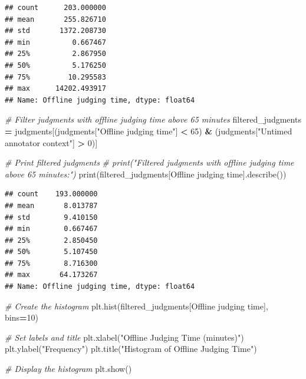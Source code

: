 \documentclass[
]{article}
\newenvironment{Shaded}{\begin{snugshade}}{\end{snugshade}}
\newcommand{\BuiltInTok}[1]{#1}
\newcommand{\CommentTok}[1]{\textcolor[rgb]{0.56,0.35,0.01}{\textit{#1}}}
\newcommand{\DecValTok}[1]{\textcolor[rgb]{0.00,0.00,0.81}{#1}}
\newcommand{\NormalTok}[1]{#1}
\newcommand{\OperatorTok}[1]{\textcolor[rgb]{0.81,0.36,0.00}{\textbf{#1}}}
\newcommand{\StringTok}[1]{\textcolor[rgb]{0.31,0.60,0.02}{#1}}
\begin{document}
\begin{verbatim}
## count      203.000000
## mean       255.826710
## std       1372.208730
## min          0.667467
## 25%          2.867950
## 50%          5.176250
## 75%         10.295583
## max      14202.493917
## Name: Offline judging time, dtype: float64
\end{verbatim}

\begin{Shaded}
\begin{Highlighting}[]
\CommentTok{\# Filter judgments with offline judging time above 65 minutes}
\NormalTok{filtered\_judgments }\OperatorTok{=}\NormalTok{ judgments[(judgments[}\StringTok{"Offline judging time"}\NormalTok{] }\OperatorTok{\textless{}} \DecValTok{65}\NormalTok{) }\OperatorTok{\&}\NormalTok{ (judgments[}\StringTok{"Untimed annotator context"}\NormalTok{] }\OperatorTok{\textgreater{}} \DecValTok{0}\NormalTok{)]}

\CommentTok{\# Print filtered judgments}
\CommentTok{\# print("Filtered judgments with offline judging time above 65 minutes:")}
\BuiltInTok{print}\NormalTok{(filtered\_judgments[}\StringTok{\textquotesingle{}Offline judging time\textquotesingle{}}\NormalTok{].describe())}
\end{Highlighting}
\end{Shaded}

\begin{verbatim}
## count    193.000000
## mean       8.013787
## std        9.410150
## min        0.667467
## 25%        2.850450
## 50%        5.107450
## 75%        8.716300
## max       64.173267
## Name: Offline judging time, dtype: float64
\end{verbatim}

\begin{Shaded}
\begin{Highlighting}[]
\CommentTok{\# Create the histogram}
\NormalTok{plt.hist(filtered\_judgments[}\StringTok{\textquotesingle{}Offline judging time\textquotesingle{}}\NormalTok{], bins}\OperatorTok{=}\DecValTok{10}\NormalTok{)}

\CommentTok{\# Set labels and title}
\NormalTok{plt.xlabel(}\StringTok{"Offline Judging Time (minutes)"}\NormalTok{)}
\NormalTok{plt.ylabel(}\StringTok{"Frequency"}\NormalTok{)}
\NormalTok{plt.title(}\StringTok{"Histogram of Offline Judging Time"}\NormalTok{)}

\CommentTok{\# Display the histogram}
\NormalTok{plt.show()}
\end{Highlighting}
\end{Shaded}
\end{document}
